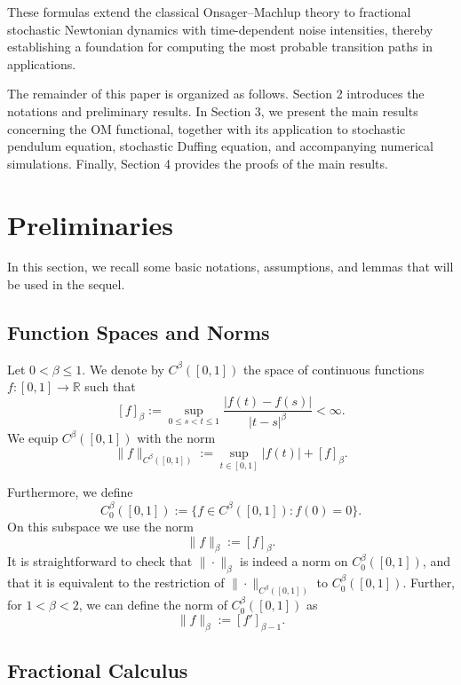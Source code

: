 \documentclass{article}
\theoremstyle{definition}  %
\theoremstyle{plain}  %
\begin{document}
These formulas extend the classical Onsager–Machlup theory to fractional stochastic Newtonian dynamics with time-dependent noise intensities, thereby establishing a foundation for computing the most probable transition paths in applications.

The remainder of this paper is organized as follows. Section 2 introduces the notations and preliminary results. In Section 3, we present the main results concerning the OM functional, together with its application to  stochastic pendulum equation,  stochastic Duffing equation, and accompanying numerical simulations. Finally, Section 4 provides the proofs of the main results.


\section{Preliminaries}
In this section, we recall some basic notations, assumptions, and lemmas that will be used in the sequel.
\subsection{Function Spaces and Norms}
    Let $0<\beta\le 1$. We denote by $C^\beta([0,1])$ the space of continuous functions
$f:[0,1]\to\mathbb{R}$ such that
\begin{equation}\label{eq:Holder-seminorm}
    [f]_\beta := \sup_{0\le s<t\le 1} \frac{|f(t)-f(s)|}{|t-s|^\beta} < \infty.
\end{equation}
We equip $C^\beta([0,1])$ with the norm
\begin{equation*}
    \|f\|_{C^\beta([0,1])} := \sup_{t\in[0,1]} |f(t)| + [f]_\beta.
\end{equation*}

Furthermore, we define
\begin{equation*}
    C^\beta_0([0,1]) := \{ f\in C^\beta([0,1]) : f(0)=0 \}.
\end{equation*}
On this subspace we use the norm
\begin{equation*}
    \|f\|_\beta := [f]_\beta.
\end{equation*}
It is straightforward to check that $\|\cdot\|_\beta$ is indeed a norm on
$C^\beta_0([0,1])$, and that it is equivalent to the restriction of 
$\|\cdot\|_{C^\beta([0,1])}$ to $C^\beta_0([0,1])$.
Further, for \(1 < \beta < 2\), we can define the norm of \(C_0^{\beta}([0,1])\) as  
\[
\|f\|_{\beta} := [f']_{\beta-1}.
\]


    
\subsection{Fractional Calculus}
\end{document}
